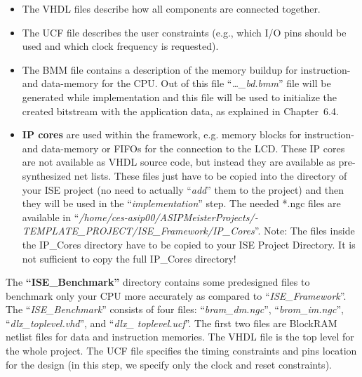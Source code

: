 \begin{itemize}
\item
  The VHDL files describe how all components are connected together.
\item
  The UCF file describes the user constraints (e.g., which I/O pins
  should be used and which clock frequency is requested).
\item
  The BMM file contains a description of the memory buildup for
  instruction- and data-memory for the CPU. Out of this file
  ``\emph{\ldots\_bd.bmm}'' file will be generated while implementation
  and this file will be used to initialize the created bitstream with
  the application data, as explained in Chapter~6.4.
\item
  \textbf{IP cores} are used within the framework, e.g. memory blocks
  for instruction- and data-memory or FIFOs for the connection to the
  LCD. These IP cores are not available as VHDL source code, but instead
  they are available as pre-synthesized net lists. These files just have
  to be copied into the directory of your ISE project (no need to
  actually ``\emph{add}'' them to the project) and then they will be
  used in the ``\emph{implementation}'' step. The needed *.ngc files are
  available in
  ``\emph{/home/ces-asip00/­ASIPMeisterProjects/­TEMPLATE\_PROJECT/­ISE\_Framework/­IP\_­Cores}''.
  Note: The files {inside} the IP\_Cores directory have to be copied to
  your ISE Project Directory. It is not sufficient to copy the full
  IP\_Cores directory!
\end{itemize}

The \textbf{``ISE\_}\textbf{Benchmark''} directory contains some
predesigned files to benchmark only your CPU more accurately as compared
to ``\emph{ISE\_Framework}''. The ``\emph{ISE\_Benchmark}'' consists of
four files: ``\emph{bram\_dm.ngc}'', ``\emph{brom\_im.ngc}'',
``\emph{dlx\_}\emph{toplevel.vhd}'', and ``\emph{dlx\_ toplevel.ucf}''.
The first two files are BlockRAM netlist files for data and instruction
memories. The VHDL file is the top level for the whole project. The UCF
file specifies the timing constraints and pins location for the design
(in this step, we specify only the clock and reset constraints).

